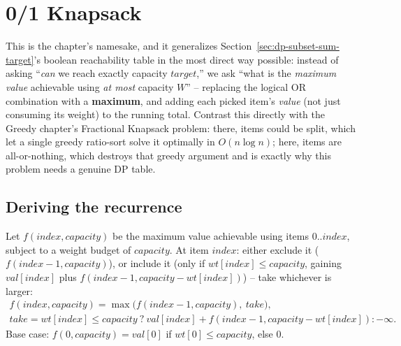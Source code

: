 \section{0/1 Knapsack}
\label{sec:dp-01-knapsack}


\begin{patternbox}
This is the chapter's namesake, and it generalizes
Section~\ref{sec:dp-subset-sum-target}'s boolean reachability table in
the most direct way possible: instead of asking ``\emph{can} we reach
exactly capacity $\textit{target}$,'' we ask ``what is the
\emph{maximum value} achievable using \emph{at most} capacity $W$'' --
replacing the logical OR combination with a \textbf{maximum}, and adding
each picked item's \emph{value} (not just consuming its weight) to the
running total. Contrast this directly with
the Greedy chapter's Fractional Knapsack problem: there,
items could be split, which let a single greedy ratio-sort solve it
optimally in $O(n \log n)$; here, items are all-or-nothing, which
destroys that greedy argument and is exactly why this problem needs a
genuine DP table.
\end{patternbox}

\subsection*{Deriving the recurrence}

Let $f(\textit{index}, \textit{capacity})$ be the maximum value
achievable using items $0..\textit{index}$, subject to a weight budget
of $\textit{capacity}$. At item $\textit{index}$: either exclude it
($f(\textit{index}-1, \textit{capacity})$), or include it (only if
$\textit{wt}[\textit{index}] \le \textit{capacity}$, gaining
$\textit{val}[\textit{index}]$ plus
$f(\textit{index}-1, \textit{capacity}-\textit{wt}[\textit{index}])$) --
take whichever is larger:
\begin{gather*}
  f(\textit{index}, \textit{capacity}) = \max\Big(
  f(\textit{index}{-}1, \textit{capacity}),\ \textit{take} \Big), \\
  \textit{take} = \textit{wt}[\textit{index}] \le \textit{capacity}\ ?\
  \textit{val}[\textit{index}] + f(\textit{index}{-}1,
  \textit{capacity}-\textit{wt}[\textit{index}]) : -\infty.
\end{gather*}
Base case: $f(0, \textit{capacity}) = \textit{val}[0]$ if
$\textit{wt}[0] \le \textit{capacity}$, else $0$.

